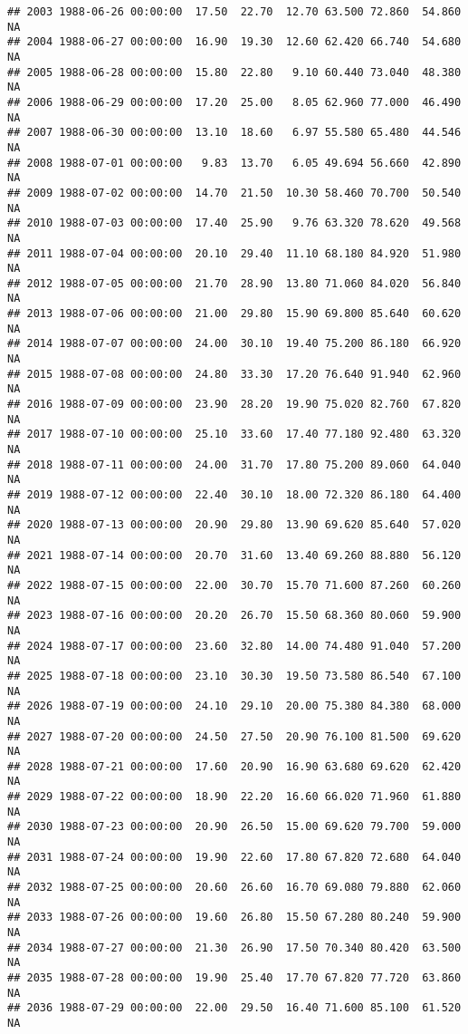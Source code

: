\documentclass{article}\usepackage{graphicx, color}
\makeatletter
\newenvironment{kframe}{%
 \def\at@end@of@kframe{}%
 \ifinner\ifhmode%
  \def\at@end@of@kframe{\end{minipage}}%
  \begin{minipage}{\columnwidth}%
 \fi\fi%
 \def\FrameCommand##1{\hskip\@totalleftmargin \hskip-\fboxsep
 \colorbox{shadecolor}{##1}\hskip-\fboxsep
     \hskip-\linewidth \hskip-\@totalleftmargin \hskip\columnwidth}%
 \MakeFramed {\advance\hsize-\width
   \@totalleftmargin\z@ \linewidth\hsize
   \@setminipage}}%
 {\par\unskip\endMakeFramed%
 \at@end@of@kframe}
\newenvironment{knitrout}{}{} %
\makeatother
\begin{document}
\begin{knitrout}
\begin{kframe}
\begin{verbatim}
## 2003 1988-06-26 00:00:00  17.50  22.70  12.70 63.500 72.860  54.860     NA
## 2004 1988-06-27 00:00:00  16.90  19.30  12.60 62.420 66.740  54.680     NA
## 2005 1988-06-28 00:00:00  15.80  22.80   9.10 60.440 73.040  48.380     NA
## 2006 1988-06-29 00:00:00  17.20  25.00   8.05 62.960 77.000  46.490     NA
## 2007 1988-06-30 00:00:00  13.10  18.60   6.97 55.580 65.480  44.546     NA
## 2008 1988-07-01 00:00:00   9.83  13.70   6.05 49.694 56.660  42.890     NA
## 2009 1988-07-02 00:00:00  14.70  21.50  10.30 58.460 70.700  50.540     NA
## 2010 1988-07-03 00:00:00  17.40  25.90   9.76 63.320 78.620  49.568     NA
## 2011 1988-07-04 00:00:00  20.10  29.40  11.10 68.180 84.920  51.980     NA
## 2012 1988-07-05 00:00:00  21.70  28.90  13.80 71.060 84.020  56.840     NA
## 2013 1988-07-06 00:00:00  21.00  29.80  15.90 69.800 85.640  60.620     NA
## 2014 1988-07-07 00:00:00  24.00  30.10  19.40 75.200 86.180  66.920     NA
## 2015 1988-07-08 00:00:00  24.80  33.30  17.20 76.640 91.940  62.960     NA
## 2016 1988-07-09 00:00:00  23.90  28.20  19.90 75.020 82.760  67.820     NA
## 2017 1988-07-10 00:00:00  25.10  33.60  17.40 77.180 92.480  63.320     NA
## 2018 1988-07-11 00:00:00  24.00  31.70  17.80 75.200 89.060  64.040     NA
## 2019 1988-07-12 00:00:00  22.40  30.10  18.00 72.320 86.180  64.400     NA
## 2020 1988-07-13 00:00:00  20.90  29.80  13.90 69.620 85.640  57.020     NA
## 2021 1988-07-14 00:00:00  20.70  31.60  13.40 69.260 88.880  56.120     NA
## 2022 1988-07-15 00:00:00  22.00  30.70  15.70 71.600 87.260  60.260     NA
## 2023 1988-07-16 00:00:00  20.20  26.70  15.50 68.360 80.060  59.900     NA
## 2024 1988-07-17 00:00:00  23.60  32.80  14.00 74.480 91.040  57.200     NA
## 2025 1988-07-18 00:00:00  23.10  30.30  19.50 73.580 86.540  67.100     NA
## 2026 1988-07-19 00:00:00  24.10  29.10  20.00 75.380 84.380  68.000     NA
## 2027 1988-07-20 00:00:00  24.50  27.50  20.90 76.100 81.500  69.620     NA
## 2028 1988-07-21 00:00:00  17.60  20.90  16.90 63.680 69.620  62.420     NA
## 2029 1988-07-22 00:00:00  18.90  22.20  16.60 66.020 71.960  61.880     NA
## 2030 1988-07-23 00:00:00  20.90  26.50  15.00 69.620 79.700  59.000     NA
## 2031 1988-07-24 00:00:00  19.90  22.60  17.80 67.820 72.680  64.040     NA
## 2032 1988-07-25 00:00:00  20.60  26.60  16.70 69.080 79.880  62.060     NA
## 2033 1988-07-26 00:00:00  19.60  26.80  15.50 67.280 80.240  59.900     NA
## 2034 1988-07-27 00:00:00  21.30  26.90  17.50 70.340 80.420  63.500     NA
## 2035 1988-07-28 00:00:00  19.90  25.40  17.70 67.820 77.720  63.860     NA
## 2036 1988-07-29 00:00:00  22.00  29.50  16.40 71.600 85.100  61.520     NA

\end{verbatim}
\end{kframe}
\end{knitrout}
\end{document}
